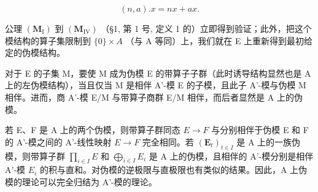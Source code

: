 \[
(n, a). x = n x + a x.\tag{2}
\]

公理 \((\mathbf{M}_{\mathrm{I}})\) 到 \((\mathbf{M}_{\mathrm{IV}})\) （§1, 第 1 号, 定义 1 的）立即得到验证；此外，把这个模结构的算子集限制到 \(\{0\} \times A\) （与 A 等同）上，我们就在 E 上重新得到最初给定的伪模结构。

对于 E 的子集 M，要使 M 成为伪模 E 的带算子子群（此时诱导结构显然也是 A 上的左伪模结构），当且仅当 M 是相伴 A'-模 E 的子模，且此子 A'-模与伪模 M 相伴。进而，商 A'-模 E/M 与带算子商群 E/M 相伴，而后者显然是 A 上的伪模。

若 E、F 是 A 上的两个伪模，则带算子群同态 \(E \rightarrow F\) 与分别相伴于伪模 E 和 F 的 A'-模之间的 A'-线性映射 \(E \rightarrow F\) 完全相同。若 \((\mathbf{E}_{t})_{t \in I}\) 是 A 上的一族伪模，则带算子群 \(\prod_{i\in I}E\) 和 \(\bigoplus_{i\in I}E_{i}\) 是 A 上的伪模，且相伴的 A'-模分别是相伴 A'-模 \(E_{i}\) 的积与直和。对伪模的逆极限与直极限也有类似的结果。因此，A 上伪模的理论可以完全归结为 A'-模的理论。

\BourbakiExercisesHeading
